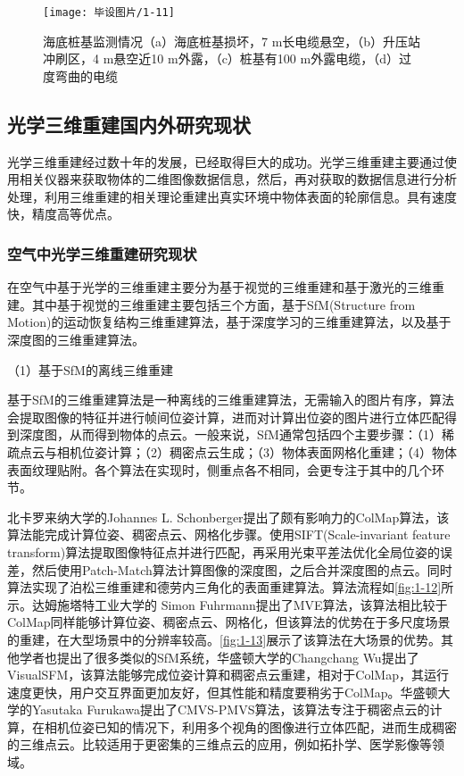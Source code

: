 \begin{figure}[htbp]
    \centering
    \texttt{[image: 毕设图片/1-11]}
    \caption{\label{fig:1-11}海底桩基监测情况（a）海底桩基损坏，7 m长电缆悬空，（b）升压站冲刷区，4 m悬空近10 m外露，（c）桩基有100 m外露电缆，（d）过度弯曲的电缆\cite{国船}}
\end{figure}

\subsection{光学三维重建国内外研究现状}
光学三维重建经过数十年的发展，已经取得巨大的成功。光学三维重建主要通过使用相关仪器来获取物体的二维图像数据信息，然后，再对获取的数据信息进行分析处理，利用三维重建的相关理论重建出真实环境中物体表面的轮廓信息。具有速度快，精度高等优点。

\subsubsection{空气中光学三维重建研究现状}

在空气中基于光学的三维重建主要分为基于视觉的三维重建和基于激光的三维重建。其中基于视觉的三维重建主要包括三个方面，基于SfM(Structure from Motion)\cite{SfM}的运动恢复结构三维重建算法，基于深度学习的三维重建算法，以及基于深度图的三维重建算法。

（1）基于SfM的离线三维重建

基于SfM的三维重建算法是一种离线的三维重建算法，无需输入的图片有序，算法会提取图像的特征并进行帧间位姿计算，进而对计算出位姿的图片进行立体匹配得到深度图，从而得到物体的点云。一般来说，SfM通常包括四个主要步骤：（1）稀疏点云与相机位姿计算；（2）稠密点云生成；（3）物体表面网格化重建；（4）物体表面纹理贴附。各个算法在实现时，侧重点各不相同，会更专注于其中的几个环节。

北卡罗来纳大学的Johannes L. Schonberger提出了颇有影响力的ColMap\cite{schoenberger2016sfm}\cite{schoenberger2016mvs}算法，该算法能完成计算位姿、稠密点云、网格化步骤。使用SIFT(Scale-invariant feature transform)\cite{sift}算法提取图像特征点并进行匹配，再采用光束平差法优化全局位姿的误差，然后使用Patch-Match\cite{Barnes}算法计算图像的深度图，之后合并深度图的点云。同时算法实现了泊松三维重建和德劳内三角化的表面重建算法。算法流程如\autoref{fig:1-12}所示。达姆施塔特工业大学的 Simon Fuhrmann提出了MVE\cite{Fuhrmann}算法，该算法相比较于ColMap同样能够计算位姿、稠密点云、网格化，但该算法的优势在于多尺度场景的重建，在大型场景中的分辨率较高。\autoref{fig:1-13}展示了该算法在大场景的优势。其他学者也提出了很多类似的SfM系统，华盛顿大学的Changchang Wu提出了VisualSFM\cite{Towards}，该算法能够完成位姿计算和稠密点云重建，相对于ColMap，其运行速度更快，用户交互界面更加友好，但其性能和精度要稍劣于ColMap。华盛顿大学的Yasutaka Furukawa提出了CMVS-PMVS\cite{MVE}算法，该算法专注于稠密点云的计算，在相机位姿已知的情况下，利用多个视角的图像进行立体匹配，进而生成稠密的三维点云。比较适用于更密集的三维点云的应用，例如拓扑学、医学影像等领域。

